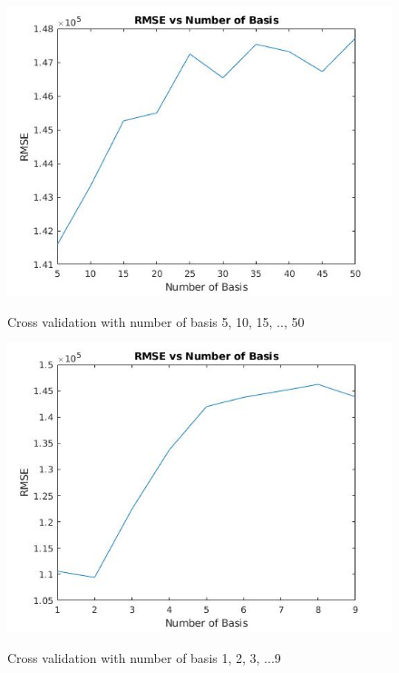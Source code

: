 \documentclass[11pt]{article} %
\begin{document}
\begin{figure}[H] 
  \begin{minipage}[H]{0.5\linewidth}\label{ m1cv1} 
    \includegraphics[width=1\linewidth]{m1CV1.jpg} 
    \caption{Cross validation with number of basis 5, 10, 15, .., 50} 
  \end{minipage} 
  \begin{minipage}[H]{0.5\linewidth}\label{ m1cv2} 
    \includegraphics[width=1\linewidth]{m1CV2.jpg} 
    \caption{Cross validation with number of basis 1, 2, 3, ...9} 
  \end{minipage} 
  \begin{minipage}[H]{0.5\linewidth}\label{ m1nocv} 

\end{minipage}
\end{figure}
\end{document}
